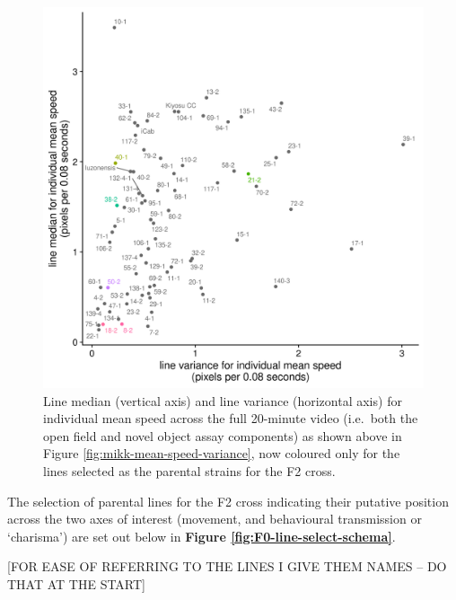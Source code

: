 \documentclass[
]{book}
\begin{document}
\begin{figure}
\includegraphics[width=1\linewidth]{figs/mikk_behaviour/line_mean_speed_variance_selected} \caption{Line median (vertical axis) and line variance (horizontal axis) for individual mean speed across the full 20-minute video (i.e.~both the open field and novel object assay components) as shown above in Figure \ref{fig:mikk-mean-speed-variance}, now coloured only for the lines selected as the parental strains for the F2 cross.}\label{fig:F0-line-mean-speed-var-select}
\end{figure}

The selection of parental lines for the F2 cross indicating their putative position across the two axes of interest (movement, and behavioural transmission or `charisma') are set out below in \textbf{Figure \ref{fig:F0-line-select-schema}}.



{[}FOR EASE OF REFERRING TO THE LINES I GIVE THEM NAMES -- DO THAT AT THE START{]}
\end{document}
